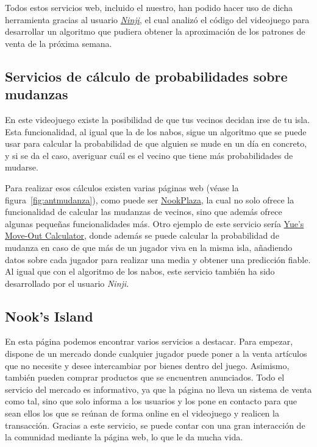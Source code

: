Todos estos servicios web, incluido el nuestro, han podido hacer uso de dicha herramienta gracias al usuario \textit{\href{https://twitter.com/_Ninji/status/1244818665851289602?s=20}{Ninji}}, el cual analizó el código del videojuego para desarrollar un algoritmo que pudiera obtener la aproximación de los patrones de venta de la próxima semana.

\subsection{Servicios de cálculo de probabilidades sobre mudanzas}

En este videojuego existe la posibilidad de que tus vecinos decidan irse de tu isla. Esta funcionalidad, al igual que la de los nabos, sigue un algoritmo que se puede usar para calcular la probabilidad de que alguien se mude en un día en concreto, y si se da el caso, averiguar cuál es el vecino que tiene más probabilidades de mudarse.\\


Para realizar esos cálculos existen varias páginas web {(v\'ease la figura~\ref{fig:antmudanza})}, como puede ser \href{https://nookplaza.net/tools?tab=move_out}{NookPlaza}, la cual no solo ofrece la funcionalidad de calcular las mudanzas de vecinos, sino que además ofrece algunas pequeñas funcionalidades más. Otro ejemplo de este servicio sería \href{https://yuexr.github.io/villager-moveout-calculator/}{Yue's Move-Out Calculator}, donde además se puede calcular la probabilidad de mudanza en caso de que más de un jugador viva en la misma isla, añadiendo datos sobre cada jugador para realizar una media y obtener una predicción fiable.\\

Al igual que con el algoritmo de los nabos, este servicio también ha sido desarrollado por el usuario \textit{Ninji}.

\clearpage

\subsection{Nook’s Island}


En esta página podemos encontrar varios servicios a destacar. Para empezar, dispone de un mercado donde cualquier jugador puede poner a la venta artículos que no necesite y desee intercambiar por bienes dentro del juego. Asimismo, también pueden comprar productos que se encuentren anunciados. Todo el servicio del mercado es informativo, ya que la página no lleva un sistema de venta como tal, sino que solo informa a los usuarios y los pone en contacto para que sean ellos los que se reúnan de forma online en el videojuego y realicen la transacción. Gracias a este servicio, se puede contar con una gran interacción de la comunidad mediante la página web, lo que le da mucha vida.\\

